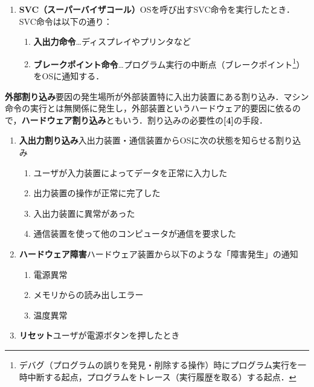 \begin{enumerate}[label=\textbf{[\Alph*]}, labelsep=10pt, leftmargin=23pt]
\begin{enumerate}[label=\textbf{(\arabic*)}, labelsep=10pt, leftmargin=23pt]
			\item \textbf{SVC（スーパーバイザコール）}\quad OSを呼び出すSVC命令を実行したとき．SVC命令は以下の通り：
				\begin{enumerate}[label={\color{gray}●}, labelsep=10pt, leftmargin=23pt]
					\item \textbf{入出力命令}…ディスプレイやプリンタなど
					\item \textbf{ブレークポイント命令}…プログラム実行の中断点（ブレークポイント\footnote{デバグ（プログラムの誤りを発見・削除する操作）時にプログラム実行を一時中断する起点，プログラムをトレース（実行履歴を取る）する起点．}）をOSに通知する．
				\end{enumerate}
		\end{enumerate}
	\item \textbf{外部割り込み}\quad 要因の発生場所が外部装置特に入出力装置にある割り込み．マシン命令の実行とは無関係に発生し，外部装置というハードウェア的要因に依るので，\textbf{ハードウェア割り込み}ともいう．割り込みの必要性の\textbf{[4]}の手段．
		\begin{enumerate}[label=\textbf{(\arabic*)}, labelsep=10pt, leftmargin=23pt]
			\item \textbf{入出力割り込み}\quad 入出力装置・通信装置からOSに次の状態を知らせる割り込み
				\begin{enumerate}[label=\textbf{(\roman*)}, labelsep=10pt, leftmargin=23pt]
					\item ユーザが入力装置によってデータを正常に入力した
					\item 出力装置の操作が正常に完了した
					\item 入出力装置に異常があった
					\item 通信装置を使って他のコンピュータが通信を要求した
				\end{enumerate}
			\item \textbf{ハードウェア障害}\quad ハードウェア装置から以下のような「障害発生」の通知
				\begin{enumerate}[label=\textbf{(\roman*)}, labelsep=10pt, leftmargin=23pt]
					\item 電源異常
					\item メモリからの読み出しエラー
					\item 温度異常
				\end{enumerate}
			\item \textbf{リセット}\quad ユーザが電源ボタンを押したとき
		\end{enumerate}
\end{enumerate}

